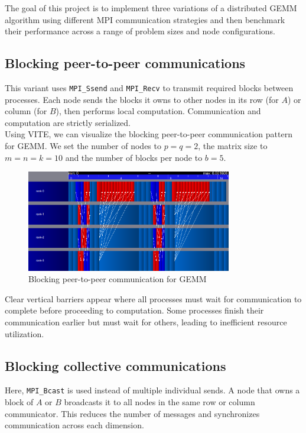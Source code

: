\documentclass[12pt,a4paper]{article}
\begin{document}
The goal of this project is to implement three variations of a distributed GEMM algorithm using different MPI communication strategies and then benchmark their performance across a range of problem sizes and node configurations.

\subsection{Blocking peer-to-peer communications}

This variant uses \texttt{MPI\_Ssend} and \texttt{MPI\_Recv} to transmit required blocks between processes.
Each node sends the blocks it owns to other nodes in its row (for \(A\)) or column (for \(B\)), then performs local computation.
Communication and computation are strictly serialized. \\

Using VITE, we can visualize the blocking peer-to-peer communication pattern for GEMM.
We set the number of nodes to \(p = q = 2\), the matrix size to \(m = n = k = 10\) and the number of blocks per node to \(b = 5\).
\begin{figure}[H]
    \centering
    \includegraphics[width=0.8\textwidth]{src/p2p.png}
    \caption{Blocking peer-to-peer communication for GEMM}
    \label{fig:p2p}
\end{figure}

Clear vertical barriers appear where all processes must wait for communication to complete before proceeding to computation.
Some processes finish their communication earlier but must wait for others, leading to inefficient resource utilization.


\subsection{Blocking collective communications}

Here, \texttt{MPI\_Bcast} is used instead of multiple individual sends.
A node that owns a block of \(A\) or \(B\) broadcasts it to all nodes in the same row or column communicator.
This reduces the number of messages and synchronizes communication across each dimension.\\
\end{document}
